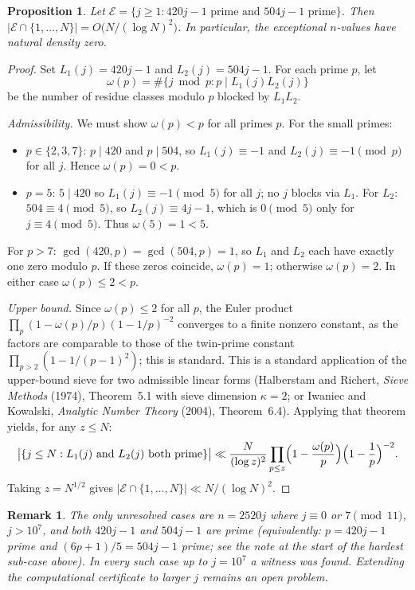 \documentclass[11pt]{article}
\newtheorem{proposition}{Proposition}
\newtheorem{remark}{Remark}
\begin{document}
\begin{proposition}\label{prop:density}
Let $\mathcal{E} = \{j \ge 1 : 420j-1 \text{ prime and } 504j-1 \text{ prime}\}$.
Then $|\mathcal{E} \cap \{1,\ldots,N\}| = O\bigl(N/(\log N)^2\bigr)$.
In particular, the exceptional $n$-values have natural density zero.
\end{proposition}

\begin{proof}
Set $L_1(j) = 420j-1$ and $L_2(j) = 504j-1$.  For each prime $p$, let
\[
  \omega(p) = \#\bigl\{j \bmod p : p \mid L_1(j)L_2(j)\bigr\}
\]
be the number of residue classes modulo $p$ blocked by $L_1L_2$.

\emph{Admissibility.}  We must show $\omega(p) < p$ for all primes $p$.
For the small primes:
\begin{itemize}
  \item $p \in \{2,3,7\}$: $p \mid 420$ and $p \mid 504$, so $L_1(j) \equiv -1$
        and $L_2(j) \equiv -1 \pmod{p}$ for all $j$.  Hence $\omega(p)=0<p$.
  \item $p=5$: $5\mid 420$ so $L_1(j)\equiv -1\pmod 5$ for all $j$; no $j$ blocks
        via $L_1$.  For $L_2$: $504\equiv 4\pmod 5$, so $L_2(j)\equiv 4j-1$,
        which is $0\pmod 5$ only for $j\equiv 4\pmod 5$.  Thus $\omega(5)=1<5$.
\end{itemize}
For $p > 7$: $\gcd(420,p)=\gcd(504,p)=1$, so $L_1$ and $L_2$ each have exactly
one zero modulo $p$.  If these zeros coincide, $\omega(p)=1$; otherwise
$\omega(p)=2$.  In either case $\omega(p)\le 2<p$.

\emph{Upper bound.}  Since $\omega(p)\le 2$ for all $p$, the Euler product
$\prod_p(1-\omega(p)/p)(1-1/p)^{-2}$ converges to a finite nonzero constant,
as the factors are comparable to those of the twin-prime constant
$\prod_{p>2}(1-1/(p-1)^2)$; this is standard.
This is a standard application of the upper-bound sieve for two admissible
linear forms
(Halberstam and Richert, \emph{Sieve Methods} (1974),
Theorem~5.1 with sieve dimension $\kappa = 2$; or Iwaniec and Kowalski,
\emph{Analytic Number Theory} (2004), Theorem~6.4).
Applying that theorem yields, for any $z \le N$:
\[
  \bigl|\{j \le N : L_1(j)\text{ and }L_2(j)\text{ both prime}\}\bigr|
  \ll \frac{N}{(\log z)^2}\prod_{p\le z}\Bigl(1-\frac{\omega(p)}{p}\Bigr)
  \Bigl(1-\frac1p\Bigr)^{-2}.
\]
Taking $z = N^{1/2}$ gives $|\mathcal{E}\cap\{1,\ldots,N\}|\ll N/(\log N)^2$.
\end{proof}

\begin{remark}\label{rem:gap}
The only unresolved cases are $n = 2520j$ where $j \equiv 0$ or $7 \pmod{11}$,
$j > 10^7$, and both $420j-1$ and $504j-1$ are prime
(equivalently: $p = 420j-1$ prime and $(6p+1)/5 = 504j-1$ prime;
see the note at the start of the hardest sub-case above).
In every such case up to $j = 10^7$ a witness was found.
Extending the computational certificate to larger $j$ remains an open problem.
\end{remark}
\end{document}
